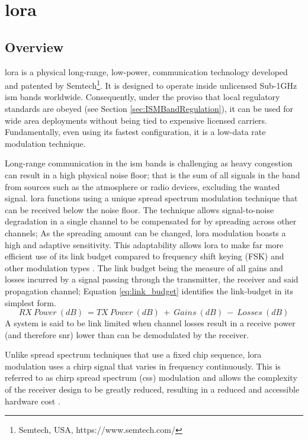 \section{\ac{lora}}
\label{sec:lora}
\subsection{Overview}
\ac{lora} is a physical long-range, low-power, communication technology developed and patented by Semtech\footnote{Semtech, USA, https://www.semtech.com/}. It is designed to operate inside unlicensed Sub-1GHz \ac{ism} bands worldwide. Consequently, under the proviso that local regulatory standards are obeyed (see Section \ref{sec:ISMBandRegulation}), it can be used for wide area deployments without being tied to expensive licensed carriers. Fundamentally, even using its fastest configuration, it is a low-data rate modulation technique.

Long-range communication in the \ac{ism} bands is challenging as heavy congestion can result in a high physical noise floor; that is the sum of all signals in the band from sources such as the atmosphere or radio devices, excluding the wanted signal. \ac{lora} functions using a unique spread spectrum modulation technique that can be received below the noise floor. The technique allows signal-to-noise degradation in a single channel to be compensated for by spreading across other channels; As the spreading amount can be changed, \ac{lora} modulation boasts a high and adaptive sensitivity. This adaptability allows \ac{lora} to make far more efficient use of its link budget compared to frequency shift keying (FSK) and other modulation types \cite{3YP:LORA_MOD_BASICS}. The link budget being the measure of all gains and losses incurred by a signal passing through the transmitter, the receiver and said propagation channel; Equation \ref{eq:link_budget} identifies the link-budget in its simplest form.
\begin{equation}
\label{eq:link_budget}
RX\ Power\ (dB)\ = TX\ Power\ (dB)\ +\ Gains\ (dB)\ -\ Losses\ (dB)
\end{equation}
A system is said to be link limited when channel losses result in a receive power (and therefore \ac{snr}) lower than can be demodulated by the receiver. 

Unlike spread spectrum techniques that use a fixed chip sequence, \ac{lora} modulation uses a chirp signal that varies in frequency continuously. This is referred to as chirp spread spectrum (\ac{css}) modulation and allows the complexity of the receiver design to be greatly reduced, resulting in a reduced and accessible hardware cost \cite{3YP:LORA_MOD_BASICS}. 

